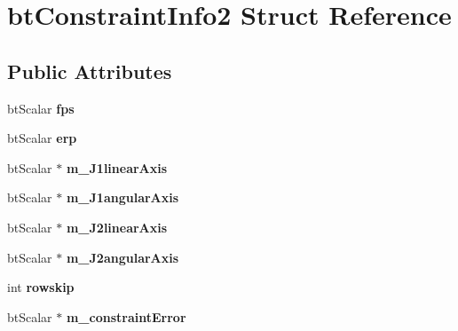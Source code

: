 \hypertarget{structbt_constraint_info2}{\section{bt\+Constraint\+Info2 Struct Reference}
\label{structbt_constraint_info2}
}
\subsection*{Public Attributes}
\begin{DoxyCompactItemize}
\item 
\hypertarget{structbt_constraint_info2_a758269a654c7e879172098323722a6ea}{bt\+Scalar {\bfseries fps}}\label{structbt_constraint_info2_a758269a654c7e879172098323722a6ea}

\item 
\hypertarget{structbt_constraint_info2_a1bd8e6285e47472bfd307aa5582365e7}{bt\+Scalar {\bfseries erp}}\label{structbt_constraint_info2_a1bd8e6285e47472bfd307aa5582365e7}

\item 
\hypertarget{structbt_constraint_info2_ac398d0352e205c30f487d4ed55f3e97a}{bt\+Scalar $\ast$ {\bfseries m\+\_\+\+J1linear\+Axis}}\label{structbt_constraint_info2_ac398d0352e205c30f487d4ed55f3e97a}

\item 
\hypertarget{structbt_constraint_info2_a268282b87836c2a215e9362657fc3ff4}{bt\+Scalar $\ast$ {\bfseries m\+\_\+\+J1angular\+Axis}}\label{structbt_constraint_info2_a268282b87836c2a215e9362657fc3ff4}

\item 
\hypertarget{structbt_constraint_info2_a036315b576ba6858f8c55ce60dca4224}{bt\+Scalar $\ast$ {\bfseries m\+\_\+\+J2linear\+Axis}}\label{structbt_constraint_info2_a036315b576ba6858f8c55ce60dca4224}

\item 
\hypertarget{structbt_constraint_info2_a0d15a36c97cb60500c5f3aaf6eeecc85}{bt\+Scalar $\ast$ {\bfseries m\+\_\+\+J2angular\+Axis}}\label{structbt_constraint_info2_a0d15a36c97cb60500c5f3aaf6eeecc85}

\item 
\hypertarget{structbt_constraint_info2_aebdf1a06e1ad055c3cf72796992d1a1a}{int {\bfseries rowskip}}\label{structbt_constraint_info2_aebdf1a06e1ad055c3cf72796992d1a1a}

\item 
\hypertarget{structbt_constraint_info2_aa8eda5783f00ebf8a802d430bbd13e70}{bt\+Scalar $\ast$ {\bfseries m\+\_\+constraint\+Error}}\label{structbt_constraint_info2_aa8eda5783f00ebf8a802d430bbd13e70}


\end{DoxyCompactItemize}
